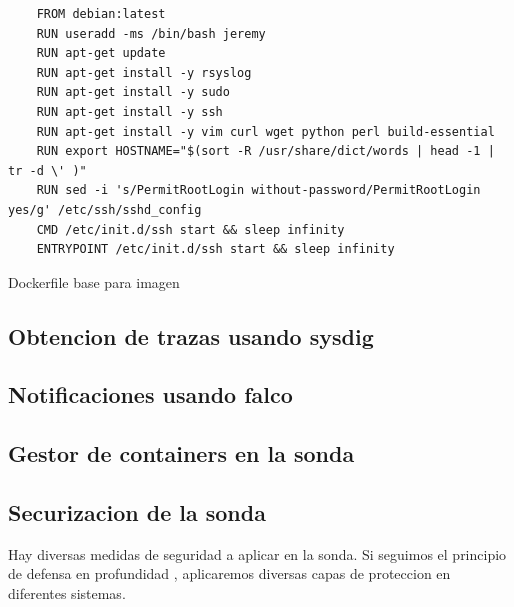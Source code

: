 \begin{listing}
\begin{verbatim}
    FROM debian:latest
    RUN useradd -ms /bin/bash jeremy
    RUN apt-get update
    RUN apt-get install -y rsyslog
    RUN apt-get install -y sudo
    RUN apt-get install -y ssh
    RUN apt-get install -y vim curl wget python perl build-essential
    RUN export HOSTNAME="$(sort -R /usr/share/dict/words | head -1 | tr -d \' )"
    RUN sed -i 's/PermitRootLogin without-password/PermitRootLogin yes/g' /etc/ssh/sshd_config
    CMD /etc/init.d/ssh start && sleep infinity
    ENTRYPOINT /etc/init.d/ssh start && sleep infinity
\end{verbatim}
\caption{Dockerfile base para imagen}
\label{listing:Dockerfile-base}
\end{listing}







\subsection{Obtencion de trazas usando sysdig}


\subsection{Notificaciones usando falco}


\subsection{Gestor de containers en la sonda}



\subsection{Securizacion de la sonda}

Hay diversas medidas de seguridad a aplicar en la sonda. Si seguimos el principio de defensa en profundidad \cite{wikipedia-defense-in-depth}, aplicaremos diversas capas de proteccion en diferentes sistemas.

